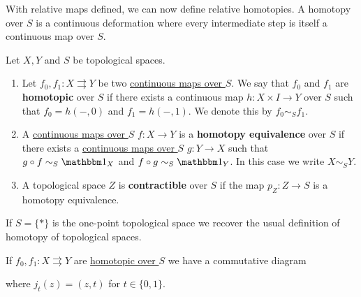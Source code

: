 \documentclass[../../main]{subfiles}
\begin{document}
With relative maps defined, we can now define relative homotopies.
A homotopy over \(S\) is a continuous deformation where every intermediate step is itself a continuous map over \(S\).

\begin{definition}\label{def:homotopy-over}
  Let \(X, Y\) and \(S\) be topological spaces.
  \begin{enumerate}
    \item Let \(f_{0},f_{1}\colon X \rightrightarrows Y\) be two \hyperref[def:continuous-map-over]{continuous maps over \(S\)}.
          We say that \(f_{0}\) and \(f_{1}\) are \textbf{homotopic} over \(S\) if there exists a continuous map \(h\colon X \times I \to Y\) over \(S\) such that \(f_{0} = h(-, 0)\) and \(f_{1} = h(-, 1)\).
          We denote this by \(f_{0} \sim_{S} f_{1}\).
    \item A \hyperref[def:continuous-map-over]{continuous maps over \(S\)} \(f\colon X \to Y\) is a \textbf{homotopy equivalence} over \(S\) if there exists a \hyperref[def:continuous-map-over]{continuous maps over \(S\)} \(g\colon Y \to X\) such that \(g \circ f \sim_{S} \id_{X}\) and \(f \circ g \sim_{S} \id_{Y}\).
          In this case we write \(X \sim_{S} Y\).
    \item A topological space \(Z\) is \textbf{contractible} over \(S\) if the map \(p_{Z}\colon Z \to S\) is a homotopy equivalence.
  \end{enumerate}
\end{definition}

\begin{example}
  If \(S = \{\ast\}\) is the one-point topological space we recover the usual definition of homotopy of topological spaces.
\end{example}

\begin{remark}
  If \(f_{0}, f_{1}\colon X \rightrightarrows Y\) are \hyperref[def:homotopy-over]{homotopic over \(S\)} we have a commutative diagram
  \begin{center}
  \end{center}
  where \(j_{t}(z) = (z, t)\) for \(t \in \{0, 1\}\).
\end{remark}
\end{document}

